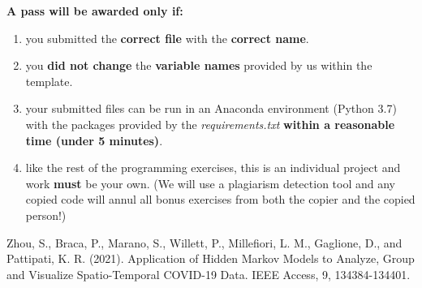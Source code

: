 \documentclass[a4paper,10pt]{article}
\begin{document}
    
    \textbf{A pass will be awarded only if:}
    \vspace{-0.3cm}
    \begin{enumerate}
        \item you submitted the \textbf{correct file} with the \textbf{correct name}.
        \item you \textbf{did not change} the \textbf{variable names} provided by us within the template.
        \item your submitted files can be run in an Anaconda environment (Python 3.7) with the packages provided by the \textit{requirements.txt} \textbf{within a reasonable time (under 5 minutes)}.
        \item like the rest of the programming exercises, this is an individual project and work \textbf{must} be your own. (We will use a plagiarism detection tool and any copied code will annul all bonus exercises from both the copier and the copied person!)
    \end{enumerate}
    
    \begin{thebibliography}{1}
         Zhou, S., Braca, P., Marano, S., Willett, P., Millefiori, L. M., Gaglione, D., and Pattipati, K. R. (2021). Application of Hidden Markov Models to Analyze, Group and Visualize Spatio-Temporal COVID-19 Data. IEEE Access, 9, 134384-134401.
    \end{thebibliography}
    
    
\end{document}
